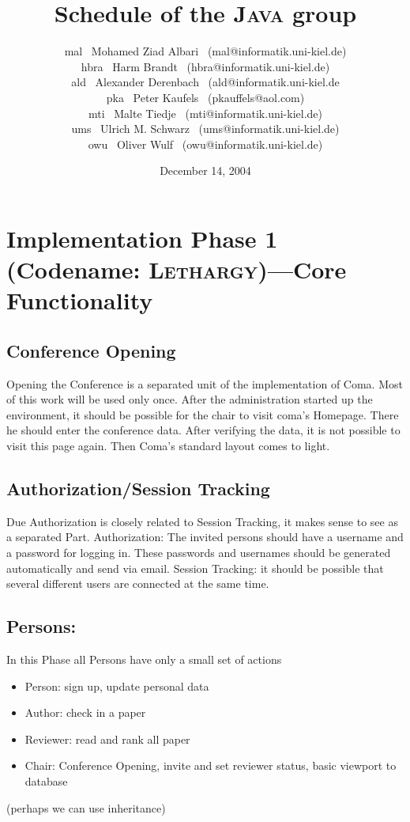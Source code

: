 \documentclass[a4paper]{article}
\title{Schedule of the \textsc{Java} group}
\date{December 14, 2004}
\author{mal \ Mohamed Ziad Albari \ (mal@informatik.uni-kiel.de)\\
hbra \ Harm Brandt \ (hbra@informatik.uni-kiel.de)\\
ald \ Alexander Derenbach \ (ald@informatik.uni-kiel.de\\
pka \ Peter Kaufels \ (pkauffels@aol.com)\\
mti \ Malte Tiedje \ (mti@informatik.uni-kiel.de) \\
ums \ Ulrich M. Schwarz \ (ums@informatik.uni-kiel.de) \\
owu \ Oliver Wulf \ (owu@informatik.uni-kiel.de)}
\begin{document}
\maketitle
\tableofcontents

\section{Implementation Phase 1 (Codename: \textsc{Lethargy})---Core Functionality}
  \subsection{Conference Opening} \label{sec:1:opening}
  Opening the Conference is a separated unit of the implementation of Coma. 
Most of this work will be used only once.
  After the administration started up the environment, it should be possible for the chair
to visit coma's Homepage. There he should enter the conference data. After verifying the data, it is not possible to visit this page again. Then Coma's standard layout comes to light.
\subsection{Authorization/Session Tracking}\label{sec:1:authorization}
Due Authorization is closely related to Session Tracking, it makes sense to see as a separated Part.
Authorization: The invited persons should have a username and a password for logging in.
These passwords and usernames should be generated automatically and send via email.
Session Tracking: it should be possible that several different users are connected at the same time.

	\subsection{Persons:}\label{sec:1:persons}
  In this Phase all Persons have only a small set of actions
  \begin{itemize}
  	\item Person: sign up, update personal data
  	\item Author: check in a paper
  	\item Reviewer: read and rank all paper
  	\item Chair: Conference Opening, invite and set reviewer status, basic viewport to database
  \end{itemize}
 (perhaps we can use inheritance)
\end{document}
